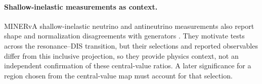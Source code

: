 \paragraph{Shallow-inelastic measurements as context.} MINERvA shallow-inelastic neutrino and antineutrino measurements also report shape and normalization disagreements with generators \cite{MINERvA:2026sis}. They motivate tests across the resonance--DIS transition, but their selections and reported observables differ from this inclusive projection, so they provide physics context, not an independent confirmation of these central-value ratios. A later significance for a region chosen from the central-value map must account for that selection.

